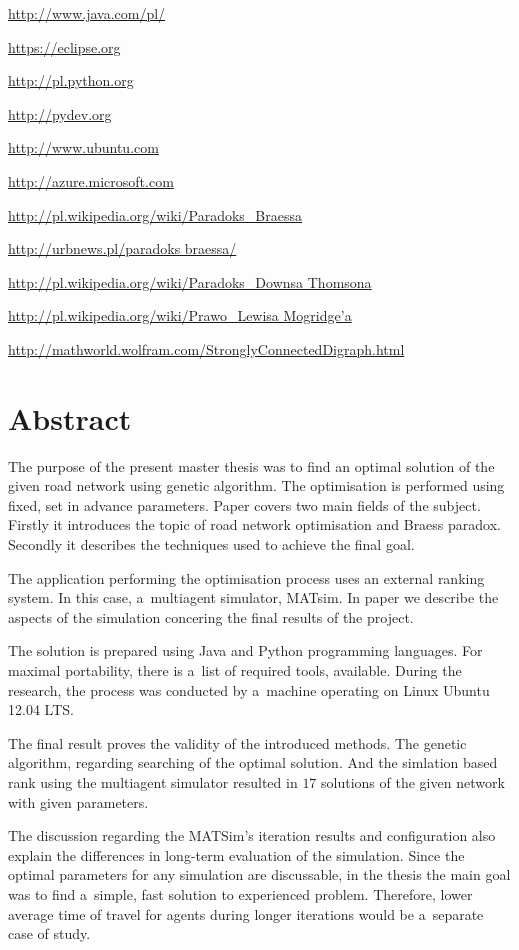 \documentclass[twoside,12pt]{report}
\let\oldsection\chapter
\def\chapter{\cleardoublepage\oldsection}
\begin{document}
\begin{thebibliography}{99}
	\url{http://www.java.com/pl/}

	\url{https://eclipse.org}
				
	\url{http://pl.python.org}
	
	\url{http://pydev.org}
	
	\url{http://www.ubuntu.com}
	
	\url{http://azure.microsoft.com}
			
	\url{http://pl.wikipedia.org/wiki/Paradoks_Braessa}
	
	\url{http://urbnews.pl/paradoks braessa/}
	
	\url{http://pl.wikipedia.org/wiki/Paradoks_Downsa Thomsona}
	
	\href{http://pl.wikipedia.org/wiki/Prawo_Lewisa Mogridge\%E2\%80\%99a}
	    {http://pl.wikipedia.org/wiki/Prawo\_Lewisa Mogridge\textquoteright{}a}
	   
	\url{http://mathworld.wolfram.com/StronglyConnectedDigraph.html}

\end{thebibliography}

\cleardoublepage
{}
{}
\chapter*{Abstract}

The purpose of the present master thesis was to find an optimal solution of the given road network using genetic algorithm. The optimisation is performed using fixed, set in advance parameters. Paper covers two main fields of the subject. Firstly it introduces the topic of road network optimisation and Braess paradox. Secondly it describes the techniques used to achieve the final goal.

The application performing the optimisation process uses an external ranking system. In this case, a~multiagent simulator, MATsim. In paper we describe the aspects of the simulation concering the final results of the project. 

The solution is prepared using Java and Python programming languages. For maximal portability, there is a~list of required tools, available. During the research, the process was conducted by a~machine operating on Linux Ubuntu 12.04 LTS.

The final result proves the validity of the introduced methods. The genetic algorithm, regarding searching of the optimal solution. And the simlation based rank using the multiagent  simulator resulted in $17$ solutions of the given network with given parameters.

The discussion regarding the MATSim's iteration results and configuration also 
explain the differences in long-term evaluation of the simulation. Since the optimal parameters for any simulation are discussable, in the thesis the main goal was to find a~simple, fast solution to experienced problem. Therefore, lower average time of travel for agents during longer iterations would be a~separate case of study.
\end{document}
